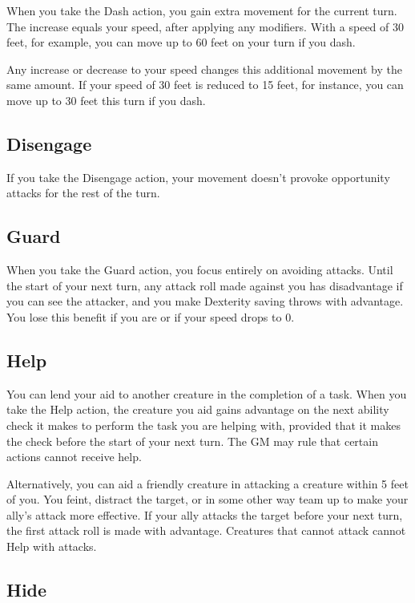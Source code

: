 When you take the Dash action, you gain extra movement for the current turn. The increase equals your speed, after applying any modifiers. With a speed of 30 feet, for example, you can move up to 60 feet on your turn if you dash.

Any increase or decrease to your speed changes this additional movement by the same amount. If your speed of 30 feet is reduced to 15 feet, for instance, you can move up to 30 feet this turn if you dash.

\subsection{Disengage}

If you take the Disengage action, your movement doesn't provoke opportunity attacks for the rest of the turn.

\subsection{Guard}

When you take the Guard action, you focus entirely on avoiding attacks. Until the start of your next turn, any attack roll made against you has disadvantage if you can see the attacker, and you make Dexterity saving throws with advantage. You lose this benefit if you are  or if your speed drops to 0.

\subsection{Help}

You can lend your aid to another creature in the completion of a task. When you take the Help action, the creature you aid gains advantage on the next ability check it makes to perform the task you are helping with, provided that it makes the check before the start of your next turn. The GM may rule that certain actions cannot receive help.

Alternatively, you can aid a friendly creature in attacking a creature within 5 feet of you. You feint, distract the target, or in some other way team up to make your ally's attack more effective. If your ally attacks the target before your next turn, the first attack roll is made with advantage. Creatures that cannot attack cannot Help with attacks.

\subsection{Hide}

